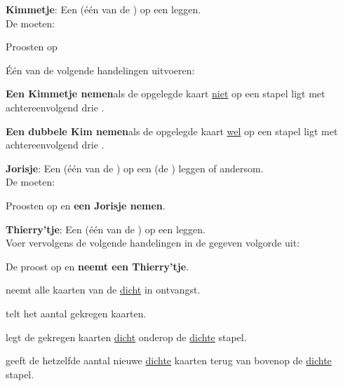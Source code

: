 \vervolgLijstKlein{}
\item \label{zet:kim} \textbf{Kimmetje}: Een  (\'e\'en van de ) op een  leggen. \\De \andereSpelers moeten:
\puntLijst{}
\item Proosten op 
\item Één van de volgende handelingen uitvoeren:
\numeriekeLijst{}
\item \textbf{Een Kimmetje nemen}\footnotemark[1] als de opgelegde kaart \ul{niet} op een stapel ligt met \\achtereenvolgend drie .
\item \textbf{Een dubbele Kim nemen}\footnotemark[2] als de opgelegde kaart \ul{wel} op een stapel ligt met \\achtereenvolgend drie .
\eindNumeriekeLijst{}
\eindPuntLijst{}
\eindLijst{}


\newpage
{}
\label{sec:zettenLang_2}

\vervolgLijstKlein{}
\item \label{zet:joris} \textbf{Jorisje}: Een  (\'e\'en van de ) op een  (de ) leggen of andersom. \\De \andereSpelers moeten:
\puntLijst{}
\item Proosten op  en \textbf{een Jorisje nemen}\footnotemark[1].
\eindPuntLijst{}
\eindLijst{}


\vervolgLijstKlein{}
\item \textbf{Thierry'tje}: Een  (\'e\'en van de ) op een  leggen. \\Voer vervolgens de volgende handelingen in de gegeven volgorde uit:
\puntLijst{}
\item De \huidigeSpeler proost op  en \textbf{neemt een Thierry'tje}\footnotemark[2].
\item \Frits neemt alle kaarten van de \huidigeSpeler \ul{dicht} in ontvangst.
\item \Frits telt het aantal gekregen kaarten.
\item \Frits legt de gekregen kaarten \ul{dicht} onderop de \ul{dichte} stapel.
\item \Frits geeft de \huidigeSpeler hetzelfde aantal nieuwe \ul{dichte} kaarten terug van bovenop de \ul{dichte} stapel.
\eindPuntLijst{}
\label{zet:thierry}
\eindLijst{}

